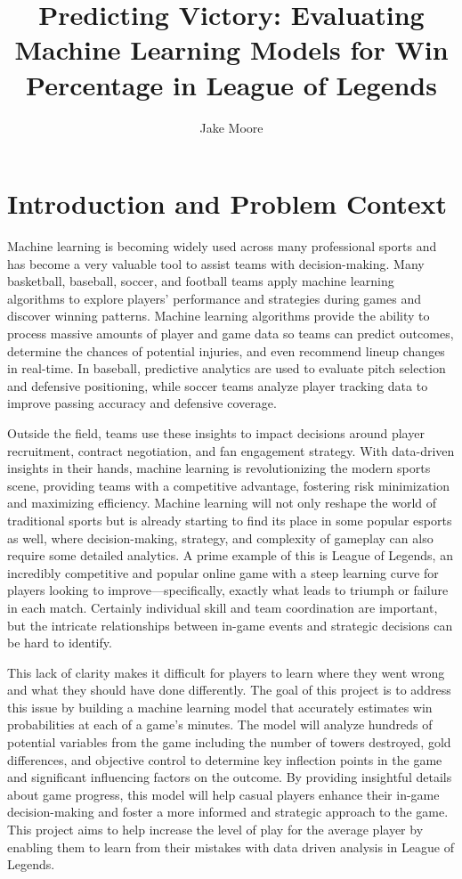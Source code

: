 \documentclass[10pt,twocolumn]{article}
\title{Predicting Victory: Evaluating Machine Learning Models for Win Percentage in League of Legends}
\author{Jake Moore}
\affiliation{Occidental College}
\begin{document}
\maketitle

\section{Introduction and Problem Context}


Machine learning is becoming widely used across many professional sports and has become a very valuable tool to assist teams with decision-making. Many basketball, baseball, soccer, and football teams apply machine learning algorithms to explore players’ performance and strategies during games and discover winning patterns. Machine learning algorithms provide the ability to process massive amounts of player and game data so teams can predict outcomes, determine the chances of potential injuries, and even recommend lineup changes in real-time. In baseball, predictive analytics are used to evaluate pitch selection and defensive positioning, while soccer teams analyze player tracking data to improve passing accuracy and defensive coverage.

Outside the field, teams use these insights to impact decisions around player recruitment, contract negotiation, and fan engagement strategy. With data-driven insights in their hands, machine learning is revolutionizing the modern sports scene, providing teams with a competitive advantage, fostering risk minimization and maximizing efficiency. Machine learning will not only reshape the world of traditional sports but is already starting to find its place in some popular esports as well, where decision-making, strategy, and complexity of gameplay can also require some detailed analytics. A prime example of this is League of Legends, an incredibly competitive and popular online game with a steep learning curve for players looking to improve—specifically, exactly what leads to triumph or failure in each match. Certainly individual skill and team coordination are important, but the intricate relationships between in-game events and strategic decisions can be hard to identify. 

This lack of clarity makes it difficult for players to learn where they went wrong and what they should have done differently. The goal of this project is to address this issue by building a machine learning model that accurately estimates win probabilities at each of a game’s minutes. The model will analyze hundreds of potential variables from the game including the number of towers destroyed, gold differences, and objective control to determine key inflection points in the game and significant influencing factors on the outcome. By providing insightful details about game progress, this model will help casual players enhance their in-game decision-making and foster a more informed and strategic approach to the game. This project aims to help increase the level of play for the average player by enabling them to learn from their mistakes with data driven analysis in League of Legends.
\end{document}
